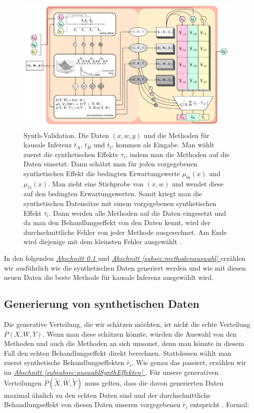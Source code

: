 \documentclass[12pt,a4paper,twoside]{scrartcl}
\numberwithin{equation}{section}
\newcommand{\refsec}[1]{\emph{\hyperref[#1]{Abschnitt \ref*{#1} }}}
\begin{document}
\begin{center}
  \vspace{6mm}
  \begin{figure}[h]
    \centering
    \includegraphics[height=0.5\textwidth, width=1\textwidth]{figures/synth-validation.png}
    \caption[Synth-Validation] {Synth-Validation\cite{schuler2017synth}. Die Daten $(x,w,y)$ und die Methoden für kausale Inferenz $t_A$, $t_B$ und $t_C$ kommen als Eingabe. Man wählt zuerst die synthetischen Effekte $\tau_i$, indem man die Methoden auf die Daten einsetzt. Dann schätzt man für jeden vorgegebenen synthetischen Effekt die bedingten Erwartungswerte $\mu_{0i}(x)$ und $\mu_{1i}(x)$. Man zieht eine Stichprobe von $(x,w)$ und wendet diese auf den bedingten Erwartungswerten. Somit kriegt man die synthetischen Datensätze mit einem vorgegebenen synthetischen Effekt $\tau_i$. Dann werden alle Methoden auf die Daten eingesetzt und da man den Behandlungseffekt von den Daten kennt, wird der durchschnittliche Fehler von jeder Methode ausgerechnet. Am Ende wird diejenige mit dem kleinsten Fehler ausgewählt \cite{schuler2017synth}.}\label{fig:synthValidation}
  \end{figure}
\end{center}

\noindent
In den folgenden \refsec{subsec:generierungSynthDaten} und \refsec{subsec:methodenauswahl} erzählen wir ausführlich wie die synthetischen Daten generiert werden und wie mit diesen neuen Daten die beste Methode für kausale Inferenz ausgewählt wird.\par

  	\subsection{Generierung von synthetischen Daten}\label{subsec:generierungSynthDaten}
Die generative Verteilung, die wir schätzen möchten, ist nicht die echte Verteilung $P(X,W,Y)$. Wenn man diese schätzen könnte, würden die Auswahl von den Methoden und auch die Methoden an sich umsonst, denn man könnte in diesem Fall den echten Behandlungseffekt direkt berechnen. Stattdessen wählt man zuerst synthetische Behandlungseffekten $\tilde{r_i}$. Wie genau das passiert, erzählen wir im \refsec{subsubsec:auswahlSynthEffekten}. Für unsere generativen Verteilungen  $P(\widetilde{X},\widetilde{W},\widetilde{Y})$ muss gelten, dass die davon generierten Daten maximal ähnlich zu den echten Daten sind und der durchschnittliche Behandlungseffekt von diesen Daten unseren vorgegebenen $\tilde{r_i}$  entspricht \cite{schuler2017synth}. Formal:\par
  	
\end{document}
